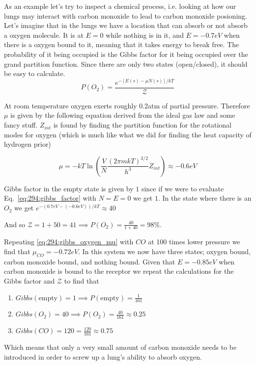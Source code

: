 \documentclass[10pt]{article}
\begin{document}
\begin{example}
	As an example let's try to inspect a chemical process, i.e. looking at how our lungs may interact with carbon monoxide to lead to carbon monoxide posioning.
	Let's imagine that in the lungs we have a location that can absorb or not absorb a oxygen molecule. It is at $ E = 0 $ while nothing is in it, and $ E = -0.7eV $ when there is a oxygen bound to it, meaning that it takes energy to break free.
	The probability of it being occupied is the Gibbs factor for it being occupied over the grand partition function. 
	Since there are only two states (open/closed), it should be easy to calculate.
	\begin{equation}
		P(O_2) = \frac{e^{-[E(s) - \mu N(s)] /kT}}{\mathcal{Z}}
	\end{equation}

	At room temperature oxygen exerts roughly 0.2atm of partial pressure. Therefore $ \mu $  is given by the following equation derived from the ideal gas law and some fancy stuff. 
	$ Z_{int} $ is found by finding the partition function for the rotational modes for oxygen (which is much like what we did for finding the heat capacity of hydrogen prior)

	\begin{equation}
		\mu = -kT \ln{\left(\frac{V}{N} \frac{(2\pi mkT)^{3/2}}{h^3} Z_{int} \right) } \approx -0.6eV
		\label{eq:294:gibbs_oxygen_mu}
	\end{equation}

	Gibbs factor in the empty state is given by $ 1 $  since if we were to evaluate Eq.~\ref{eq:294:gibbs_factor} with $ N = E = 0 $ we get $ 1 $.
	In the state where there is an $ O_2 $  we get $ e^{-(0.7 eV - (-0.6 eV)) /kT} \approx 40$ 

	And so $ \mathcal{Z} = 1+50 = 41 \implies P(O_2) = \frac{40}{1+40} = 98\% $.
	
	Repeating \ref{eq:294:gibbs_oxygen_mu} with $CO$ at 100 times lower pressure we find that $ \mu_{CO} = -0.72 eV $.
	In this system we now have three states; oxygen bound, carbon monoxide bound, and nothing bound. 
	Given that $ E = - 0.85 eV $ when carbon monoxide is bound to the receptor we repeat the calculations for the Gibbs factor and $ \mathcal{Z} $ to find that
	\begin{enumerate}
		\item $ Gibbs(\text{empty}) = 1  \implies P(\text{empty}) = \frac{1}{161} $ 
		\item $ Gibbs(O_2) = 40 \implies P(O_2) = \frac{40}{161} \approx 0.25 $ 
		\item $ Gibbs(CO) = 120 = \frac{120}{161} \approx 0.75 $
	\end{enumerate} 

	Which means that only a very small amount of carbon monoxide needs to be introduced in order to screw up a lung's ability to absorb oxygen.

\end{example}
\end{document}
